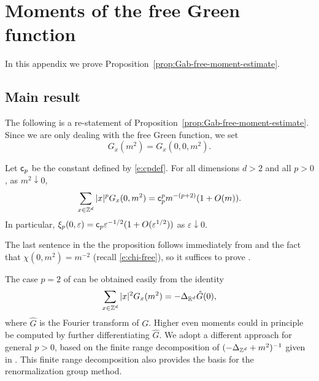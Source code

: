 \chapter{Moments of the free Green function}
\label{app:free-moments}

\setcounter{footnote}{0}

In this appendix we prove Proposition~\ref{prop:Gab-free-moment-estimate}.


\section{Main result}

The following is a re-statement of Proposition~\ref{prop:Gab-free-moment-estimate}.
Since we are only dealing with the free Green function, we set
\begin{equation}
G_x(m^2) = G_x(0, 0, m^2).
\end{equation}

\begin{prop}\label{prop:Gab-free-moment-estimate-bis}
Let ${\sf c}_p$ be the constant defined by \eqref{e:cpdef}.
For all dimensions $d>2$ and all $p>0$,
as $m^2 \downarrow 0$,
\begin{equation}
\label{e:Gab-free-moment-estimate-bis}
\sum_{x\in{ {{\mathbb Z}}^d }} |x|^p G_{x}(0, m^2)
=
{\sf c}_p^p m^{-(p + 2)} (1 + O(m)).
\end{equation}
In particular, $\xi_p(0,\varepsilon) = {\sf c}_p \varepsilon^{-1/2}
(1+O(\varepsilon^{1/2}))$ as $\varepsilon \downarrow 0$.
\end{prop}

The last sentence in the the proposition follows immediately from
 and the fact that $\chi(0,m^2)=m^{-2}$
(recall \eqref{e:chi-free}), so it suffices to prove .

The case $p = 2$ of 
can be obtained easily from the identity
\begin{equation}
\sum_{x\in{ {{\mathbb Z}}^d }} |x|^2 G_x(m^2) = -\Delta_{ {{\mathbb R}}^d} \hat{G}(0),
\end{equation}
where $\hat G$ is the Fourier transform of $G$.
Higher even moments could in principle
be computed by further differentiating $\hat G$.
We adopt a different approach
for general $p>0$,
based on the finite range decomposition of $(-\Delta_{{ {{\mathbb Z}}^d }}+m^2)^{-1}$
given in \cite{BGM04,Baue13a}.
This finite range decomposition also provides the basis for the renormalization group method.

